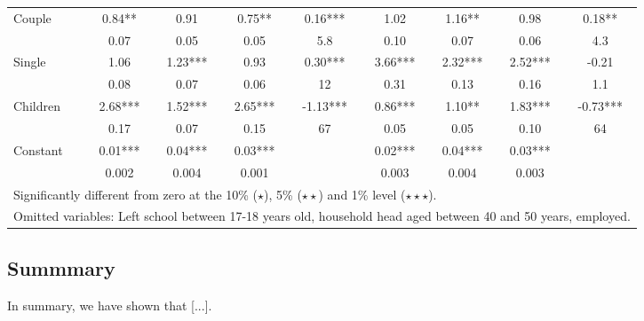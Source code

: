 \begin{table}
\begin{tabular}{l|cccc|cccc}
Couple	&	       0.84**	&	      0.91	&	     0.75**	&	0.16***	
		&	       1.02	&	       1.16**	&	      0.98	&	0.18**	\\
		&	       0.07   	&	0.05	&	0.05	&	5.8	
		&	       0.10   	&	0.07	&	0.06	&	4.3	\\
Single	&	       1.06	&	       1.23*** 	&	   0.93	&	0.30***	
		&	       3.66***	&	     2.32***	&	       2.52***	&	-0.21	\\
		&	       0.08   	&	0.07	&	0.06	&	12	
		&	       0.31   	&	0.13	&	0.16	&	1.1	\\
Children	&	       2.68***	&	     1.52***	&	      2.65***	&	-1.13***	
		&	       0.86***	&	      1.10**	&	       1.83***	&	-0.73***	\\
		&	       0.17   	&	0.07	&	0.15	& 67	
		&	       0.05   	&	0.05	&	0.10	& 64	\\
Constant            	&	       0.01***	&	       0.04***	&	       0.03***	&		&	       0.02***	&	       0.04***	&	       0.03***	&		\\
                    	&	       0.002   	&	0.004	&	0.001 	&		&	       0.003   	&	0.004	&	0.003	&		\\
\hline\hline
\multicolumn{9}{l}{Significantly different from zero at the 10\% ($\star$), 5\% ($\star\star$) and 1\% level ($\star\star\star$).} \\
\multicolumn{9}{l}{Omitted variables: Left school between 17-18 years old, household head aged between 40 and 50 years, employed. }
\end{tabular}
\label{table:interact}
\end{table}



\subsection{Summmary}

In summary, we have shown that [...].
